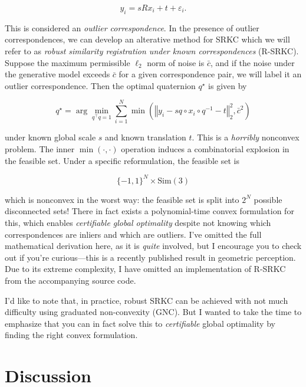 \documentclass[conference]{IEEEtran}
\begin{document}
\begin{equation}
	y_i = s R x_i + t + \varepsilon_i .
\end{equation}

This is considered an \textit{outlier correspondence}.  In the presence of outlier correspondences, we can develop an alterative method for SRKC which we will refer to as \textit{robust similarity registration under known correspondences} (R-SRKC).  Suppose the maximum permissible \( \ell_2 \) norm of noise is \( \bar{c} \), and if the noise under the generative model exceeds \( \bar{c} \) for a given correspondence pair, we will label it an outlier correspondence.  Then the optimal quaternion \( q^\star \) is given by

\begin{equation}
	q^\star = \arg \min_{q^\top q = 1} \sum_{i=1}^N \min\left( \left\Vert y_i - s q \circ x_i \circ q^{-1} - t \right\Vert_2^2, \bar{c}^2 \right)
\end{equation}

under known global scale \( s \) and known translation \( t \).  This is a \textit{horribly} nonconvex problem.  The inner \( \min(\cdot, \cdot) \) operation induces a combinatorial explosion in the feasible set.  Under a specific reformulation, the feasible set is

\begin{equation*}
	\{-1, 1\}^N \times \mathrm{Sim(3)}
\end{equation*}

which is nonconvex in the worst way: the feasible set is split into \( 2^N \) possible disconnected sets!  There in fact exists a polynomial-time convex formulation for this, which enables \textit{certifiable global optimality} despite not knowing which correspondences are inliers and which are outliers.  I've omitted the full mathematical derivation here, as it is \textit{quite} involved, but I encourage you to check out \cite{quasar} if you're curious---this is a recently published result in geometric perception.  Due to its extreme complexity, I have omitted an implementation of R-SRKC from the accompanying source code.

I'd like to note that, in practice, robust SRKC can be achieved with not much difficulty using graduated non-convexity (GNC).  But I wanted to take the time to emphasize that you can in fact solve this to \textit{certifiable} global optimality by finding the right convex formulation.

\section{Discussion}
\end{document}
